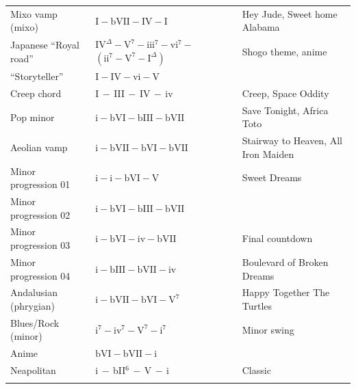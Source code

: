 \documentclass{article}
\begin{document}
\begin{table}[!h]
\begin{adjustwidth}{-3cm}{}
\begin{tabular}{p{5.0cm}p{5.5cm}p{7cm}}
	    Mixo vamp (mixo)      & $\textrm{I}-\textrm{bVII}-\textrm{IV}-\textrm{I}$ & Hey Jude, Sweet home Alabama \\
	    Japanese ``Royal road'' & $\textrm{IV}^\Delta-\textrm{V}^7-\textrm{iii}^7-\textrm{vi}^7-$ {\footnotesize $(\textrm{ii}^7-\textrm{V}^7-\textrm{I}^{\Delta})$} & Shogo theme, anime \\
	    ``Storyteller''       & $\textrm{I}-\textrm{IV}-\textrm{vi}-\textrm{V}$ & \\
	    Creep chord            & I$\,-\,$III$\,-\,$IV$\,-\,$iv &  Creep, Space Oddity \\
		Pop minor             & $\textrm{i}-\textrm{bVI}-\textrm{bIII}-\textrm{bVII}$ & Save Tonight, Africa Toto \\	    
	    Aeolian vamp          & $\textrm{i}-\textrm{bVII}-\textrm{bVI}-\textrm{bVII}$  & Stairway to Heaven, All Iron Maiden \vspace{-0.8cm}  \\ 
		Minor progression 01    & $\textrm{i}-\textrm{i}-\textrm{bVI}-\textrm{V}$ & Sweet Dreams \\	    
	    Minor progression 02    & $\textrm{i}-\textrm{bVI}-\textrm{bIII}-\textrm{bVII}$ &  \\
	    Minor progression 03    & $\textrm{i}-\textrm{bVI}-\textrm{iv}-\textrm{bVII}$ & Final countdown\\
	    Minor progression 04    & $\textrm{i}-\textrm{bIII}-\textrm{bVII}-\textrm{iv}$ & Boulevard of Broken Dreams\\
	    Andalusian	(phrygian)& $\textrm{i}-\textrm{bVII}-\textrm{bVI}-\textrm{V}^7$ & Happy Together The Turtles\\
	    Blues/Rock (minor)      & $\textrm{i}^7-\textrm{iv}^7-\textrm{V}^7-\textrm{i}^7$ & Minor swing\\
	    Anime                   & $\textrm{bVI}-\textrm{bVII}-\textrm{i}$   &             \\ 
		Neapolitan              & i$\,-\,$bII$^6\,-\,$V$\,-\,$i &  Classic \\
		\hline \vspace{-0.2cm} \\
	\end{tabular}
	\end{adjustwidth}
	\label{tab:}
\end{table}
\end{document}

